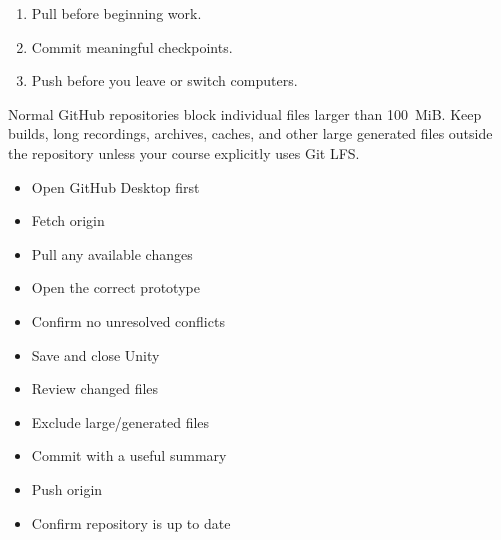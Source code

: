 \documentclass[11pt,a4paper]{article}
\begin{document}
\begin{minipage}[t]{0.48\textwidth}\vspace{0pt}
\begin{keybox}
\raggedright
\begin{enumerate}
\item Pull before beginning work.
\item Commit meaningful checkpoints.
\item Push before you leave or switch computers.
\end{enumerate}
\end{keybox}
\end{minipage}\hfill
\begin{minipage}[t]{0.48\textwidth}\vspace{0pt}
\begin{warnbox}
\raggedright
Normal GitHub repositories block individual files larger than 100~MiB. Keep builds,
long recordings, archives, caches, and other large generated files outside the
repository unless your course explicitly uses Git LFS.
\end{warnbox}
\end{minipage}

\begin{minipage}[t]{0.48\textwidth}\vspace{0pt}
\begin{keybox}
\raggedright
\begin{itemize}[label={\faSquare[regular]}]
\item Open GitHub Desktop first
\item Fetch origin
\item Pull any available changes
\item Open the correct prototype
\item Confirm no unresolved conflicts
\end{itemize}
\end{keybox}
\end{minipage}\hfill
\begin{minipage}[t]{0.48\textwidth}\vspace{0pt}
\begin{plainbox}
\raggedright
\begin{itemize}[label={\faSquare[regular]}]
\item Save and close Unity
\item Review changed files
\item Exclude large/generated files
\item Commit with a useful summary
\item Push origin
\item Confirm repository is up to date
\end{itemize}
\end{plainbox}
\end{minipage}
\end{document}
